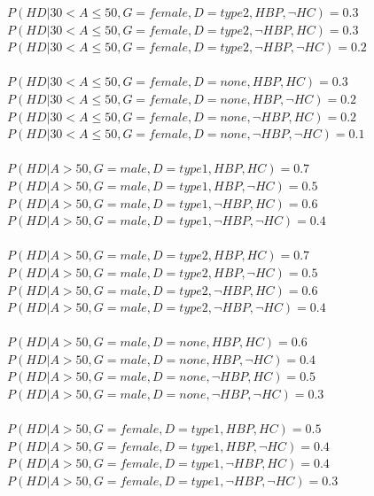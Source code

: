 \documentclass{article}
\begin{document}
$P(HD | 30 < A \leq 50, G = female, D = type2, HBP, \neg HC) = 0.3$\\
$P(HD | 30 < A \leq 50, G = female, D = type2, \neg HBP, HC) = 0.3$\\
$P(HD | 30 < A \leq 50, G = female, D = type2, \neg HBP, \neg HC) = 0.2$\\
\\
$P(HD | 30 < A \leq 50, G = female, D = none, HBP, HC) = 0.3 $\\
$P(HD | 30 < A \leq 50, G = female, D = none, HBP, \neg HC) = 0.2$\\
$P(HD | 30 < A \leq 50, G = female, D = none, \neg HBP, HC) = 0.2$\\
$P(HD | 30 < A \leq 50, G = female, D = none, \neg HBP, \neg HC) = 0.1$\\
\\
$P(HD | A > 50, G = male, D = type1, HBP, HC) = 0.7 $\\
$P(HD | A > 50, G = male, D = type1, HBP, \neg HC) = 0.5$\\
$P(HD | A > 50, G = male, D = type1, \neg HBP, HC) = 0.6$\\
$P(HD | A > 50, G = male, D = type1, \neg HBP, \neg HC) = 0.4$\\
\\
$P(HD | A > 50, G = male, D = type2, HBP, HC) = 0.7$\\
$P(HD | A > 50, G = male, D = type2, HBP, \neg HC) = 0.5$\\
$P(HD | A > 50, G = male, D = type2, \neg HBP, HC) = 0.6$\\
$P(HD | A > 50, G = male, D = type2, \neg HBP, \neg HC) = 0.4$\\
\\
$P(HD | A > 50, G = male, D = none, HBP, HC) = 0.6 $\\
$P(HD | A > 50, G = male, D = none, HBP, \neg HC) = 0.4$\\
$P(HD | A > 50, G = male, D = none, \neg HBP, HC) = 0.5$\\
$P(HD | A > 50, G = male, D = none, \neg HBP, \neg HC) = 0.3$\\
\\
$P(HD | A > 50, G = female, D = type1, HBP, HC) = 0.5 $\\
$P(HD | A > 50, G = female, D = type1, HBP, \neg HC) = 0.4$\\
$P(HD | A > 50, G = female, D = type1, \neg HBP, HC) = 0.4$\\
$P(HD | A > 50, G = female, D = type1, \neg HBP, \neg HC) = 0.3$\\
\\
\end{document}
